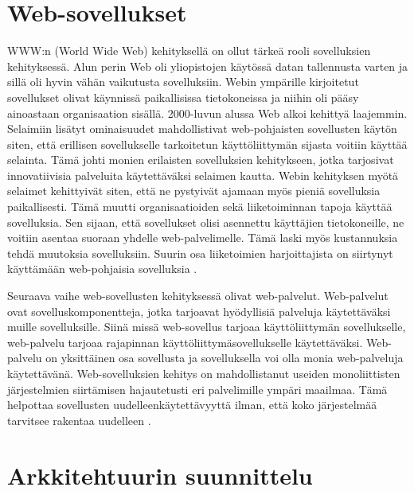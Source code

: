 \documentclass[utf8]{gradu3}
\begin{document}
\section{Web-sovellukset}
WWW:n (World Wide Web) kehityksellä on ollut tärkeä rooli sovelluksien kehityksessä. Alun perin Web oli yliopistojen käytössä datan tallennusta varten ja sillä oli hyvin vähän vaikutusta sovelluksiin. Webin ympärille kirjoitetut sovellukset olivat käynnissä paikallisissa tietokoneissa ja niihin oli pääsy ainoastaan organisaation sisällä. 2000-luvun alussa Web alkoi kehittyä laajemmin. Selaimiin lisätyt ominaisuudet mahdollistivat web-pohjaisten sovellusten käytön siten, että erillisen sovellukselle tarkoitetun käyttöliittymän sijasta voitiin käyttää selainta. Tämä johti monien erilaisten sovelluksien kehitykseen, jotka tarjosivat innovatiivisia palveluita käytettäväksi selaimen kautta. Webin kehityksen myötä selaimet kehittyivät siten, että ne pystyivät ajamaan myös pieniä sovelluksia paikallisesti. Tämä muutti organisaatioiden sekä liiketoiminnan tapoja käyttää sovelluksia. Sen sijaan, että sovellukset olisi asennettu käyttäjien tietokoneille, ne voitiin asentaa suoraan yhdelle web-palvelimelle. Tämä laski myös kustannuksia tehdä muutoksia sovelluksiin. Suurin osa liiketoimien harjoittajista on siirtynyt käyttämään web-pohjaisia sovelluksia \parencite[s.13]{Sommerville}.

Seuraava vaihe web-sovellusten kehityksessä olivat web-palvelut. Web-palvelut ovat sovelluskomponentteja, jotka tarjoavat hyödyllisiä palveluja käytettäväksi muille sovelluksille. Siinä missä web-sovellus tarjoaa käyttöliittymän sovellukselle, web-palvelu tarjoaa rajapinnan käyttöliittymäsovellukselle käytettäväksi. Web-palvelu on yksittäinen osa sovellusta ja sovelluksella voi olla monia web-palveluja käytettävänä. Web-sovelluksien kehitys on mahdollistanut useiden monoliittisten järjestelmien siirtämisen hajautetusti eri palvelimille ympäri maailmaa. Tämä helpottaa sovellusten uudelleenkäytettävyyttä ilman, että koko järjestelmää tarvitsee rakentaa uudelleen \parencite[s.13]{Sommerville}. 


\section{Arkkitehtuurin suunnittelu}
\end{document}
